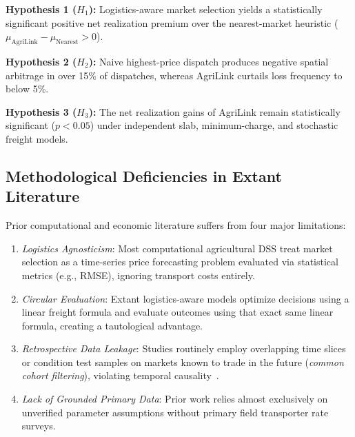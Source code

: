 \documentclass[journal]{IEEEtran}
\begin{document}
\textbf{Hypothesis 1 ($H_1$):} Logistics-aware market selection yields a statistically significant positive net realization premium over the nearest-market heuristic ($\mu_{\text{AgriLink}} - \mu_{\text{Nearest}} > 0$).

\textbf{Hypothesis 2 ($H_2$):} Naive highest-price dispatch produces negative spatial arbitrage in over 15\% of dispatches, whereas AgriLink curtails loss frequency to below 5\%.

\textbf{Hypothesis 3 ($H_3$):} The net realization gains of AgriLink remain statistically significant ($p < 0.05$) under independent slab, minimum-charge, and stochastic freight models.

\subsection{Methodological Deficiencies in Extant Literature}
Prior computational and economic literature suffers from four major limitations:
\begin{enumerate}
    \item \textit{Logistics Agnosticism}: Most computational agricultural DSS treat market selection as a time-series price forecasting problem evaluated via statistical metrics (e.g., RMSE), ignoring transport costs entirely.
    \item \textit{Circular Evaluation}: Extant logistics-aware models optimize decisions using a linear freight formula and evaluate outcomes using that exact same linear formula, creating a tautological advantage.
    \item \textit{Retrospective Data Leakage}: Studies routinely employ overlapping time slices or condition test samples on markets known to trade in the future (\textit{common cohort filtering}), violating temporal causality~\cite{kaufman2012leakage}.
    \item \textit{Lack of Grounded Primary Data}: Prior work relies almost exclusively on unverified parameter assumptions without primary field transporter rate surveys.
\end{enumerate}
\end{document}
